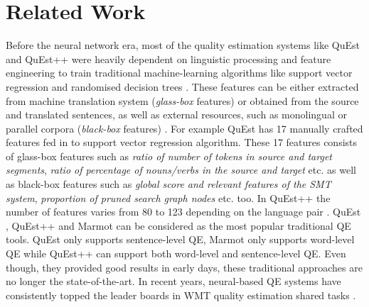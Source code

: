 \section{Related Work}
\label{sec:qe_related}
Before the neural network era, most of the quality estimation systems like QuEst \cite{specia-etal-2013-quest} and QuEst++ \cite{specia-etal-2015-multi} were heavily dependent on linguistic processing and feature engineering to train traditional machine-learning algorithms like support vector regression and randomised decision trees \cite{specia-etal-2013-quest}. These features can be either extracted from machine translation system (\textit{glass-box} features) or obtained from
the source and translated sentences, as well as external resources, such as monolingual or parallel corpora (\textit{black-box} features) \cite{specia-etal-2009-estimating}. For example QuEst \cite{specia-etal-2013-quest} has 17 manually crafted features fed in to support vector regression algorithm. These 17 features consists of glass-box features such as \textit{ratio of number of tokens in source and target segments}, \textit{ratio of percentage of nouns/verbs in the source and target} etc. as well as black-box features such as \textit{global score and relevant features of the SMT system}, \textit{proportion of pruned search graph nodes} etc. too. In QuEst++ the number of features varies from 80 to 123 depending on the language pair \cite{specia-etal-2015-multi}. QuEst \cite{specia-etal-2013-quest}, QuEst++ \cite{specia-etal-2015-multi} and Marmot \cite{logacheva-etal-2016-marmot} can be considered as the most popular traditional QE tools. QuEst \cite{specia-etal-2013-quest} only supports sentence-level QE, Marmot \cite{logacheva-etal-2016-marmot} only supports word-level QE while QuEst++ \cite{specia-etal-2015-multi} can support both word-level and sentence-level QE. Even though, they provided good results in early days, these traditional approaches are no longer the state-of-the-art. In recent years, neural-based QE systems have consistently topped the leader boards in WMT quality estimation shared tasks  \cite{kepler-etal-2019-openkiwi}. 

